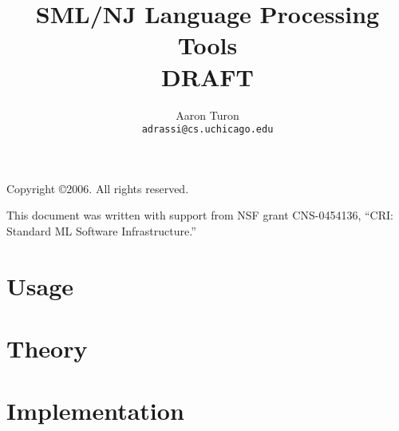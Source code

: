 \documentclass[11pt]{book}
\title{SML/NJ Language Processing Tools\\
DRAFT}
\author{Aaron Turon\\
\texttt{adrassi@cs.uchicago.edu}}
\newcommand{\parttext}{}
\newcommand{\cpart}[1]{\renewcommand{\parttext}{#1}\part{#1}}
\begin{document}
\frontmatter

	\maketitle
	
	\phantom{.}
	
	\noindent Copyright \copyright{}2006.  All rights reserved.
	
	\vskip 12pt
	\noindent This document was written with support from NSF grant CNS-0454136, ``CRI: Standard ML Software Infrastructure.''
	
	\pagebreak
	
	\tableofcontents

\mainmatter

	\renewcommand{\chaptermark}[1]{\markboth{#1}{}}
	\renewcommand{\sectionmark}[1]{\markright{\thesection. \ #1}{}}

	
	
	\renewcommand{\chaptermark}[1]{\markboth{\parttext{}: #1}{}}

	\cpart{Usage}
	
		
		
	
	\cpart{Theory}
	
		
		

	\cpart{Implementation}

		
		

\backmatter

	
	
\end{document}
